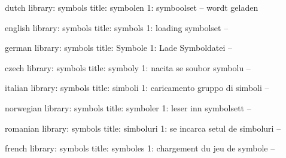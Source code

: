 


\unprotect

\startmessages  dutch  library: symbols
  title: symbolen
      1: symboolset -- wordt geladen
\stopmessages

\startmessages  english  library: symbols
  title: symbols
      1: loading symbolset --
\stopmessages

\startmessages  german  library: symbols
  title: Symbole
      1: Lade Symboldatei --
\stopmessages

\startmessages  czech  library: symbols
  title: symboly
      1: nacita se soubor symbolu --
\stopmessages

\startmessages  italian  library: symbols
  title: simboli
      1: caricamento gruppo di simboli --
\stopmessages

\startmessages  norwegian  library: symbols
  title: symboler
      1: leser inn symbolsett --
\stopmessages

\startmessages  romanian  library: symbols
  title: simboluri
      1: se incarca setul de simboluri --
\stopmessages

\startmessages  french  library: symbols
  title: symboles
      1: chargement du jeu de symbole --
\stopmessages


